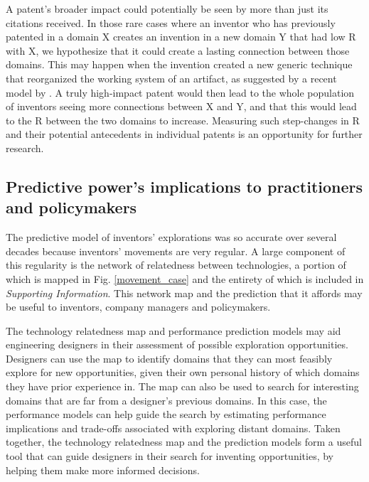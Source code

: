 \documentclass{dsj}
\begin{document}
A patent’s broader impact could potentially be seen by more than just its citations received. In those rare cases where an inventor who has previously patented in a domain X creates an invention in a new domain Y that had low R with X, we hypothesize that it could create a lasting connection between those domains. This may happen when the invention created a new generic technique that reorganized the working system of an artifact, as suggested by a recent model by \cite{Masson2017}. A truly high-impact patent would then lead to the whole population of inventors seeing more connections between X and Y, and that this would lead to the R between the two domains to increase. Measuring such step-changes in R and their potential antecedents in individual patents is an opportunity for further research.

\subsection*{Predictive power's implications to practitioners and policymakers}
The predictive model of inventors' explorations was so accurate over several decades because inventors' movements are very regular. A large component of this regularity is the network of relatedness between technologies, a portion of which is mapped in Fig. \ref{movement_case} and the entirety of which is included in \textit{Supporting Information}. This network map and the prediction that it affords may be useful to inventors, company managers and policymakers.

The technology relatedness map and performance prediction models may aid engineering designers in their assessment of possible exploration opportunities. Designers can use the map to identify domains that they can most feasibly explore for new opportunities, given their own personal history of which domains they have prior experience in. The map can also be used to search for interesting domains that are far from a designer's previous  domains. In this case, the performance models can help guide the search by estimating performance implications and trade-offs associated with exploring distant domains. Taken together, the technology relatedness map and the prediction models form a useful tool that can guide designers in their search for inventing opportunities, by helping them make more informed decisions. 
\end{document}
